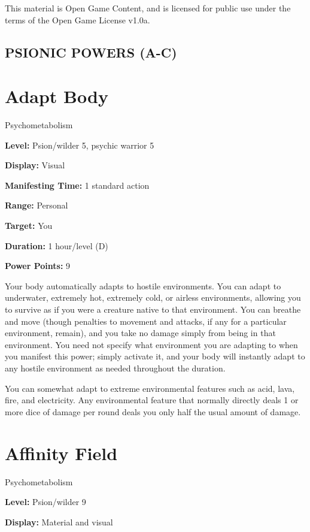 \documentclass{article}
\begin{document}
This material is Open Game Content, and is licensed for public use under the terms 
of the Open Game License v1.0a.

\subsection*{{\LARGE{}PSIONIC POWERS (A-C)}}

\vspace{12pt}
\section*{Adapt Body}

Psychometabolism

\textbf{Level:} Psion/wilder 5, psychic warrior 5

\textbf{Display:} Visual

\textbf{Manifesting Time:} 1 standard action

\textbf{Range:} Personal

\textbf{Target:} You

\textbf{Duration:} 1 hour/level (D)

\textbf{Power Points:} 9

Your body automatically adapts to hostile environments. You can adapt to underwater, 
extremely hot, extremely cold, or airless environments, allowing you to survive 
as if you were a creature native to that environment. You can breathe and move 
(though penalties to movement and attacks, if any for a particular environment, 
remain), and you take no damage simply from being in that environment. You need 
not specify what environment you are adapting to when you manifest this power; 
simply activate it, and your body will instantly adapt to any hostile environment 
as needed throughout the duration.

You can somewhat adapt to extreme environmental features such as acid, lava, fire, 
and electricity. Any environmental feature that normally directly deals 1 or more 
dice of damage per round deals you only half the usual amount of damage.

\vspace{12pt}
\section*{Affinity Field}

Psychometabolism

\textbf{Level:} Psion/wilder 9

\textbf{Display:} Material and visual
\end{document}
